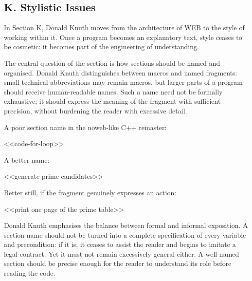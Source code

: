 \documentclass{ZGJournalArticle_2026}
\newenvironment{Shaded}{}{}
\newcommand{\NormalTok}[1]{#1}
\begin{document}
\subsection{K. Stylistic Issues}\label{k.-stylistic-issues}

In Section K, Donald Knuth moves from the architecture of WEB to the
style of working within it. Once a program becomes an explanatory text,
style ceases to be cosmetic: it becomes part of the engineering of
understanding.

The central question of the section is how sections should be named and
organised. Donald Knuth distinguishes between macros and named
fragments: small technical abbreviations may remain macros, but larger
parts of a program should receive human-readable names. Such a name need
not be formally exhaustive; it should express the meaning of the
fragment with sufficient precision, without burdening the reader with
excessive detail.

A poor section name in the noweb-like C++ remaster:

\begin{Shaded}
\begin{Highlighting}[]
\NormalTok{\textless{}\textless{}code{-}for{-}loop\textgreater{}\textgreater{}}
\end{Highlighting}
\end{Shaded}

A better name:

\begin{Shaded}
\begin{Highlighting}[]
\NormalTok{\textless{}\textless{}generate prime candidates\textgreater{}\textgreater{}}
\end{Highlighting}
\end{Shaded}

Better still, if the fragment genuinely expresses an action:

\begin{Shaded}
\begin{Highlighting}[]
\NormalTok{\textless{}\textless{}print one page of the prime table\textgreater{}\textgreater{}}
\end{Highlighting}
\end{Shaded}

Donald Knuth emphasises the balance between formal and informal
exposition. A section name should not be turned into a complete
specification of every variable and precondition: if it is, it ceases to
assist the reader and begins to imitate a legal contract. Yet it must
not remain excessively general either. A well-named section should be
precise enough for the reader to understand its role before reading the
code.
\end{document}
